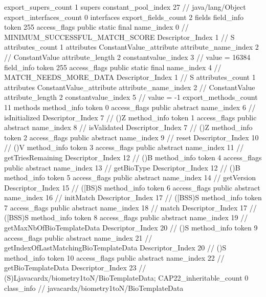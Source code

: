 {{{			export_supers_count	1
			supers {
				constant_pool_index	27		// java/lang/Object
			}
			export_interfaces_count	0
			interfaces {
			}
			export_fields_count	2
			fields {
			field_info {
				token	255
				access_flags	public static final
				name_index	0		// MINIMUM_SUCCESSFUL_MATCH_SCORE
				Descriptor_Index	1		// S
				attributes_count	1
				attributes {
				ConstantValue_attribute {
					attribute_name_index	2		// ConstantValue
					attribute_length	2
					constantvalue_index	3		// value = 16384
				}
				}
			}
			field_info {
				token	255
				access_flags	public static final
				name_index	4		// MATCH_NEEDS_MORE_DATA
				Descriptor_Index	1		// S
				attributes_count	1
				attributes {
				ConstantValue_attribute {
					attribute_name_index	2		// ConstantValue
					attribute_length	2
					constantvalue_index	5		// value = -1
				}
				}
			}
			}
			export_methods_count	11
			methods {
				method_info {
					token	0
					access_flags	public abstract
					name_index	6		// isInitialized
					Descriptor_Index	7		// ()Z
				}
				method_info {
					token	1
					access_flags	public abstract
					name_index	8		// isValidated
					Descriptor_Index	7		// ()Z
				}
				method_info {
					token	2
					access_flags	public abstract
					name_index	9		// reset
					Descriptor_Index	10		// ()V
				}
				method_info {
					token	3
					access_flags	public abstract
					name_index	11		// getTriesRemaining
					Descriptor_Index	12		// ()B
				}
				method_info {
					token	4
					access_flags	public abstract
					name_index	13		// getBioType
					Descriptor_Index	12		// ()B
				}
				method_info {
					token	5
					access_flags	public abstract
					name_index	14		// getVersion
					Descriptor_Index	15		// ([BS)S
				}
				method_info {
					token	6
					access_flags	public abstract
					name_index	16		// initMatch
					Descriptor_Index	17		// ([BSS)S
				}
				method_info {
					token	7
					access_flags	public abstract
					name_index	18		// match
					Descriptor_Index	17		// ([BSS)S
				}
				method_info {
					token	8
					access_flags	public abstract
					name_index	19		// getMaxNbOfBioTemplateData
					Descriptor_Index	20		// ()S
				}
				method_info {
					token	9
					access_flags	public abstract
					name_index	21		// getIndexOfLastMatchingBioTemplateData
					Descriptor_Index	20		// ()S
				}
				method_info {
					token	10
					access_flags	public abstract
					name_index	22		// getBioTemplateData
					Descriptor_Index	23		// (S)Ljavacardx/biometry1toN/BioTemplateData;
				}
			}
			CAP22_inheritable_count	0
		}
		class_info {		// javacardx/biometry1toN/BioTemplateData
}}}
